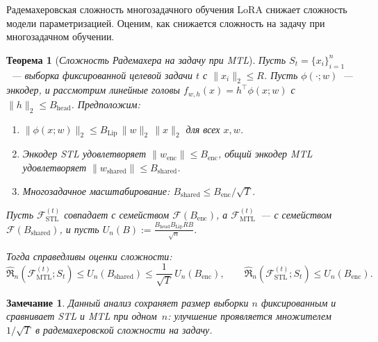\documentclass[10pt,pdf,hyperref={unicode}]{beamer}
\newtheorem{rustheorem}{Теорема}
\newtheorem{rusremark}{Замечание}
\begin{document}
\begin{frame}{Радемахеровская сложность многозадачного обучения}
\justifying
\footnotesize
LoRA снижает сложность модели параметризацией. Оценим, как снижается сложность на задачу при многозадачном обучении.

\begin{rustheorem}[\emph{Сложность Радемахера на задачу при MTL}]
    \justifying
    Пусть $S_t=\{x_i\}_{i=1}^n$~--- выборка фиксированной целевой задачи $t$ с $\|x_i\|_2 \le R$.
    Пусть $\phi(\cdot;w)$~--- энкодер, и рассмотрим линейные головы
    $f_{w,h}(x)=h^\top \phi(x;w)$ с $\|h\|_2 \le B_{\mathrm{head}}$.
    Предположим:
    \begin{enumerate}
        \item $\|\phi(x;w)\|_2 \le B_{\mathrm{Lip}}\,\|w\|_2\,\|x\|_2$ для всех $x,w$.
        \item Энкодер STL удовлетворяет $\|w_{\mathrm{enc}}\|\le B_{\mathrm{enc}}$, общий энкодер MTL удовлетворяет $\|w_{\mathrm{shared}}\|\le B_{\mathrm{shared}}$.
        \item Многозадачное масштабирование: $B_{\mathrm{shared}} \le B_{\mathrm{enc}}/\sqrt{T}$.
    \end{enumerate}

Пусть $\mathcal{F}_{\mathrm{STL}}^{(t)}$ совпадает с семейством $\mathcal{F}(B_{\mathrm{enc}})$, а $\mathcal{F}_{\mathrm{MTL}}^{(t)}$~--- с семейством $\mathcal{F}(B_{\mathrm{shared}})$, и пусть $U_n(B) := \frac{B_{\mathrm{head}}B_{\mathrm{Lip}}RB}{\sqrt{n}}$.

    Тогда справедливы оценки сложности:
    \[
        \widehat{\mathfrak R}_n\!\left(\mathcal{F}_{\mathrm{MTL}}^{(t)};S_t\right)\le U_n(B_{\mathrm{shared}})\le \frac{1}{\sqrt{T}}\,U_n(B_{\mathrm{enc}}),
        \qquad
        \widehat{\mathfrak R}_n\!\left(\mathcal{F}_{\mathrm{STL}}^{(t)};S_t\right)\le U_n(B_{\mathrm{enc}}).
    \]
\end{rustheorem}

\begin{rusremark}
    \justifying
    Данный анализ сохраняет размер выборки $n$ фиксированным и сравнивает STL и MTL при одном~$n$: улучшение проявляется множителем $1/\sqrt{T}$ в радемахеровской сложности на задачу.
\end{rusremark}

\end{frame}
\end{document}
